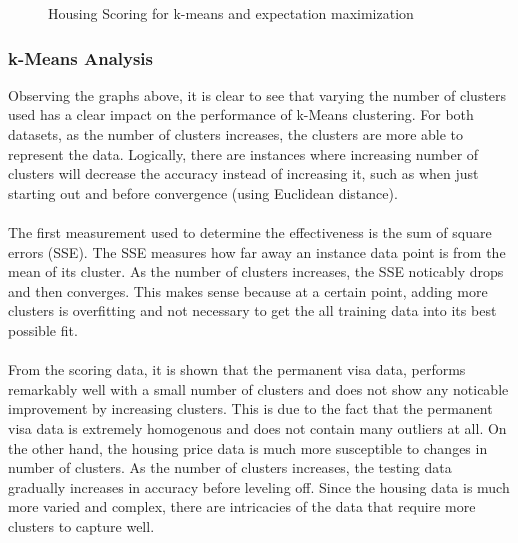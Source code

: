 \documentclass[h]{article}
\begin{document}
\begin{figure}[H]
      \caption*{Housing Scoring for k-means and expectation maximization} 
   \endminipage\hfill
\end{figure}

\subsubsection*{k-Means Analysis}
Observing the graphs above, it is clear to see that varying the number of clusters used 
has a clear impact on the performance of k-Means clustering.  For both datasets, as the number of 
clusters increases, the clusters are more able to represent the data. Logically, 
there are instances where increasing number of clusters will decrease the 
accuracy instead of increasing it, such as when just starting out and before 
convergence (using Euclidean distance).
\\ \\
The first measurement used to determine the effectiveness is the sum of square 
errors (SSE).  The SSE measures how far away an instance data point is from the mean of its cluster.
As the number of clusters increases, the SSE noticably drops and then converges.  This 
makes sense because at a certain point, adding more clusters is overfitting and 
not necessary to get the all training data into its best possible fit.
\\ \\ 
From the scoring data, it is shown that the permanent visa data, performs remarkably well with a small number of 
clusters and does not show any noticable improvement by increasing clusters.  
This is due to the fact that the permanent visa data is extremely homogenous and 
does not contain many outliers at all.   On the other hand, the housing price 
data is much more susceptible to changes in number of clusters.  As the number 
of clusters increases, the testing data gradually increases in accuracy before leveling off.  
Since the housing data is much more varied and complex, there are intricacies of 
the data that require more clusters to capture well.
\end{document}
